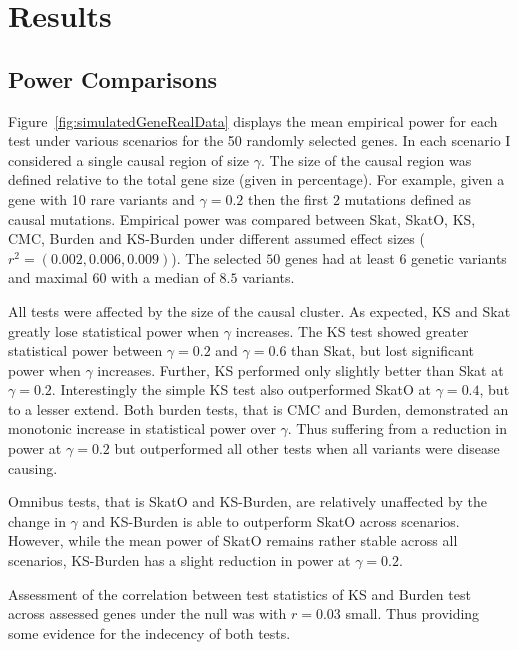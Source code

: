 \section{Results}
\label{sec:results_ksburden}

\subsection{Power Comparisons}
\label{sub:power_comparisons}

Figure~\ref{fig:simulatedGeneRealData} displays the mean empirical power for each test under various scenarios for the 50 randomly selected genes.
In each scenario I considered a single causal region of size $\gamma$.
The size of the causal region was defined relative to the total gene size (given in percentage).
For example, given a gene with 10 rare variants and $\gamma=0.2$ then the first $2$ mutations defined as causal mutations.
Empirical power was compared between Skat, SkatO, KS, CMC, Burden and KS-Burden under different assumed effect sizes ($r^2=(0.002, 0.006, 0.009)$).
The selected $50$ genes had at least $6$ genetic variants and maximal $60$ with a median of $8.5$ variants.

All tests were affected by the size of the causal cluster.
As expected, KS and Skat greatly lose statistical power when $\gamma$ increases.
The KS test showed greater statistical power between $\gamma=0.2$ and $\gamma=0.6$ than Skat, but lost significant power when $\gamma$ increases.
Further, KS performed only slightly better than Skat at $\gamma=0.2$.
Interestingly the simple KS test also outperformed SkatO at $\gamma=0.4$, but to a lesser extend.
Both burden tests, that is CMC and Burden, demonstrated an monotonic increase in statistical power over $\gamma$.
Thus suffering from a reduction in power at $\gamma=0.2$ but outperformed all other tests when all variants were disease causing.

Omnibus tests, that is SkatO and KS-Burden, are relatively unaffected by the change in $\gamma$ and KS-Burden is able to outperform SkatO across scenarios.
However, while the mean power of SkatO remains rather stable across all scenarios, KS-Burden has a slight reduction in power at $\gamma=0.2$.

Assessment of the correlation between test statistics of KS and Burden test across assessed genes under the null was with $r=0.03$ small.
Thus providing some evidence for the indecency of both tests. %

